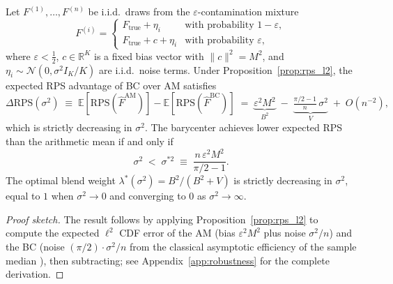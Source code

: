 \begin{proposition}
\label{prop:c2prime}
Let $F^{(1)},\ldots,F^{(n)}$ be i.i.d.\ draws from the $\varepsilon$-contamination mixture
\begin{equation}
F^{(i)} =
\begin{cases}
F_{\mathrm{true}} + \eta_i & \text{with probability } 1-\varepsilon,\\
F_{\mathrm{true}} + c + \eta_i & \text{with probability } \varepsilon,
\end{cases}
\end{equation}
where $\varepsilon < \tfrac{1}{2}$, $c \in \mathbb{R}^K$ is a fixed bias vector with
$\|c\|^2 = M^2$, and $\eta_i \sim \mathcal{N}(0,\sigma^2 I_K/K)$ are i.i.d.\ noise terms.
Under Proposition~\ref{prop:rps_l2}, the expected RPS advantage of BC over AM satisfies
\begin{equation}
\Delta\mathrm{RPS}(\sigma^2)
\;\equiv\;
\mathbb{E}[\mathrm{RPS}(\widehat{F}^{\mathrm{AM}})]
-\mathbb{E}[\mathrm{RPS}(\widehat{F}^{\mathrm{BC}})]
\;=\;
\underbrace{\varepsilon^2 M^2}_{B^2}
\;-\; \underbrace{\tfrac{\pi/2 - 1}{n}\,\sigma^2}_{V}
\;+\; O(n^{-2}),
\label{eq:delta_rps}
\end{equation}
which is strictly decreasing in $\sigma^2$.  The barycenter achieves lower expected RPS than
the arithmetic mean if and only if
\begin{equation}
\sigma^2 \;<\; \sigma^{*2} \;\equiv\;
\frac{n\,\varepsilon^2 M^2}{\pi/2 - 1}.
\label{eq:threshold}
\end{equation}
The optimal blend weight $\lambda^*(\sigma^2) = B^2/(B^2 + V)$ is strictly decreasing in
$\sigma^2$, equal to $1$ when $\sigma^2 \to 0$ and converging to $0$ as $\sigma^2 \to \infty$.
\end{proposition}

\begin{proof}[Proof sketch]
The result follows by applying Proposition~\ref{prop:rps_l2} to compute the expected $\ell^2$
CDF error of the AM (bias $\varepsilon^2 M^2$ plus noise $\sigma^2/n$) and the BC (noise
$(\pi/2)\cdot\sigma^2/n$ from the classical asymptotic efficiency of the sample median
\cite{van2000asymptotic}), then subtracting; see Appendix~\ref{app:robustness} for the
complete derivation.
\end{proof}


